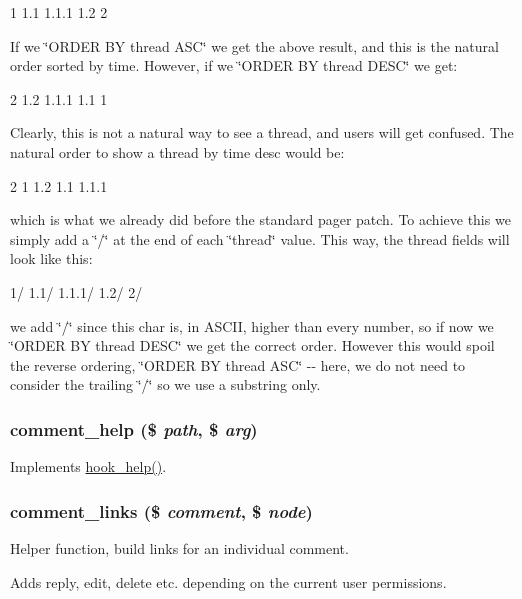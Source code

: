 1 1.1 1.1.1 1.2 2

If we \char`\"{}ORDER BY thread ASC\char`\"{} we get the above result, and this is the natural order sorted by time. However, if we \char`\"{}ORDER BY thread DESC\char`\"{} we get:

2 1.2 1.1.1 1.1 1

Clearly, this is not a natural way to see a thread, and users will get confused. The natural order to show a thread by time desc would be:

2 1 1.2 1.1 1.1.1

which is what we already did before the standard pager patch. To achieve this we simply add a \char`\"{}/\char`\"{} at the end of each \char`\"{}thread\char`\"{} value. This way, the thread fields will look like this:

1/ 1.1/ 1.1.1/ 1.2/ 2/

we add \char`\"{}/\char`\"{} since this char is, in ASCII, higher than every number, so if now we \char`\"{}ORDER BY thread DESC\char`\"{} we get the correct order. However this would spoil the reverse ordering, \char`\"{}ORDER BY thread ASC\char`\"{} -\/-\/ here, we do not need to consider the trailing \char`\"{}/\char`\"{} so we use a substring only. \hypertarget{comment_8module_a63915d30d11256dcdcd0c7e170aeefcd}{
\subsubsection[{comment\_\-help}]{\setlength{\rightskip}{0pt plus 5cm}comment\_\-help (\$ {\em path}, \/  \$ {\em arg})}}
\label{comment_8module_a63915d30d11256dcdcd0c7e170aeefcd}
Implements \hyperlink{group__hooks_ga5589c2714a782738e8851c4c90231f0e}{hook\_\-help()}. \hypertarget{comment_8module_a35585b785d03763c2ecc3f0cda6c0cf9}{
\subsubsection[{comment\_\-links}]{\setlength{\rightskip}{0pt plus 5cm}comment\_\-links (\$ {\em comment}, \/  \$ {\em node})}}
\label{comment_8module_a35585b785d03763c2ecc3f0cda6c0cf9}
Helper function, build links for an individual comment.

Adds reply, edit, delete etc. depending on the current user permissions.


